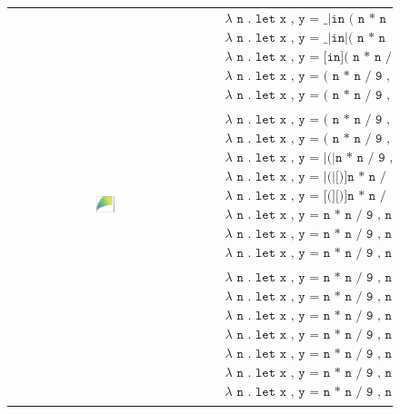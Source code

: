 \begin{figure}
  \begin{tabular}{cp{}}
  \includegraphics[width=0.1\textwidth]{img/circles-parabola-grow-1.png}
  &
  {
    \begin{align*}
      & \texttt{$\lambda$ n . let x , y = \_|in ( n * n / 9 , n ) , 1} \\
      & \texttt{$\lambda$ n . let x , y = \_|in|( n * n / 9 , n ) , 1} \\
      & \texttt{$\lambda$ n . let x , y = [in]( n * n / 9 , n ) , 1} \\
      & \texttt{$\lambda$ n . let x , y = ( n * n / 9 , n )[in], 1} \\
      & \texttt{$\lambda$ n . let x , y = ( n * n / 9 , n )|in \_ , 1} \\\\
      & \texttt{$\lambda$ n . let x , y = ( n * n / 9 , n|) in x , y , 1 } \\
      & \texttt{$\lambda$ n . let x , y = ( n * n / 9 , n|)|in x , y , 1 } \\
      & \texttt{$\lambda$ n . let x , y = |(|n * n / 9 , n[)]in x , y , 1 } \\
      & \texttt{$\lambda$ n . let x , y = |(|[)]n * n / 9 , n in x , y , 1 } \\
      & \texttt{$\lambda$ n . let x , y = [(][)]n * n / 9 , n in x , y , 1 } \\
      & \texttt{$\lambda$ n . let x , y = n * n / 9 , n in [(][)]x , y , 1 } \\
      & \texttt{$\lambda$ n . let x , y = n * n / 9 , n in ( x , y[)], 1 } \\
      & \texttt{$\lambda$ n . let x , y = n * n / 9 , n in ( x , y|) , 1 } \\\\
      & \texttt{$\lambda$ n . let x , y = n * n / 9 , n in ( x , y ) ,|x + y } \\
      & \texttt{$\lambda$ n . let x , y = n * n / 9 , n in ( x , y ) ,|(|[)]x + y } \\
      & \texttt{$\lambda$ n . let x , y = n * n / 9 , n in ( x , y ) ,|(|x + y[)]} \\
      & \texttt{$\lambda$ n . let x , y = n * n / 9 , n in ( x , y ) , ( x + y|)} \\
      & \texttt{$\lambda$ n . let x , y = n * n / 9 , n in ( x , y ) , ( x + y )|} \\
      & \texttt{$\lambda$ n . let x , y = n * n / 9 , n in ( x , y ) , ( x + y ) /|\_} \\
      & \texttt{$\lambda$ n . let x , y = n * n / 9 , n in ( x , y ) , ( x + y ) / 4|}
    \end{align*}
  }
  \end{tabular}
\end{figure}

